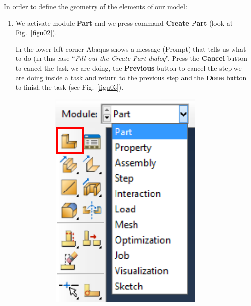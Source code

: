 In order to define the geometry of the elements of our model:
\begin{enumerate}
\item We activate module \textbf{Part} and we press command
  \textbf{Create Part} (look at Fig.~\ref{figu02}).

  In the lower left corner Abaqus shows a message (Prompt) that tells
  us what to do (in this case ``\textit{Fill out the Create Part
    dialog}''. Press the \textbf{Cancel} button to cancel the task we
  are doing, the \textbf{Previous} button to cancel the step we are
  doing inside a task and return to the previous step and the
  \textbf{Done} button to finish the task (see Fig.~\ref{figu03}).

\begin{figure}[H]
  \centering
  \begin{subfigure}{0.25\textwidth}
    \includegraphics[width=\textwidth]{./body/images/imagen02.pdf}

\end{subfigure}
\end{figure}
\end{enumerate}
